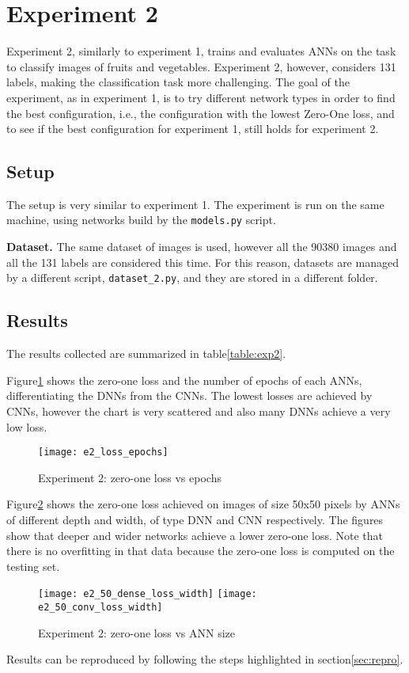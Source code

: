 \section{Experiment 2}
\label{sec:exp2}
Experiment 2, similarly to experiment 1, trains and evaluates ANNs on the task to classify images of fruits and vegetables. Experiment 2, however, considers 131 labels, making the classification task more challenging. The goal of the experiment, as in experiment 1, is to try different network types in order to find the best configuration, i.e., the configuration with the lowest Zero-One loss, and to see if the best configuration for experiment 1, still holds for experiment 2.

\subsection{Setup}
The setup is very similar to experiment 1. The experiment is run on the same machine, using networks build by the \texttt{models.py} script.

\textbf{Dataset.} The same dataset of images is used, however all the 90380 images and all the 131 labels are considered this time. For this reason, datasets are managed by a different script, \texttt{dataset\_2.py}, and they are stored in a different folder.

\subsection{Results}
The results collected are summarized in table\ref{table:exp2}.


Figure\ref{fig:e2_loss_epochs} shows the zero-one loss and the number of epochs of each ANNs, differentiating the DNNs from the CNNs. The lowest losses are achieved by CNNs, however the chart is very scattered and also many DNNs achieve a very low loss.
\begin{figure}
\texttt{[image: e2\_loss\_epochs]}
\caption{Experiment 2: zero-one loss vs epochs}\label{fig:e2_loss_epochs}
\end{figure}

Figure\ref{fig:e2_50_loss_width} shows the zero-one loss achieved on images of size 50x50 pixels by ANNs of different depth and width, of type DNN and CNN respectively. The figures show that deeper and wider networks achieve a lower zero-one loss. Note that there is no overfitting in that data because the zero-one loss is computed on the testing set.
\begin{figure}
\texttt{[image: e2\_50\_dense\_loss\_width]}
\texttt{[image: e2\_50\_conv\_loss\_width]}
\caption{Experiment 2: zero-one loss vs ANN size}\label{fig:e2_50_loss_width}
\end{figure}

Results can be reproduced by following the steps highlighted in section\ref{sec:repro}.
